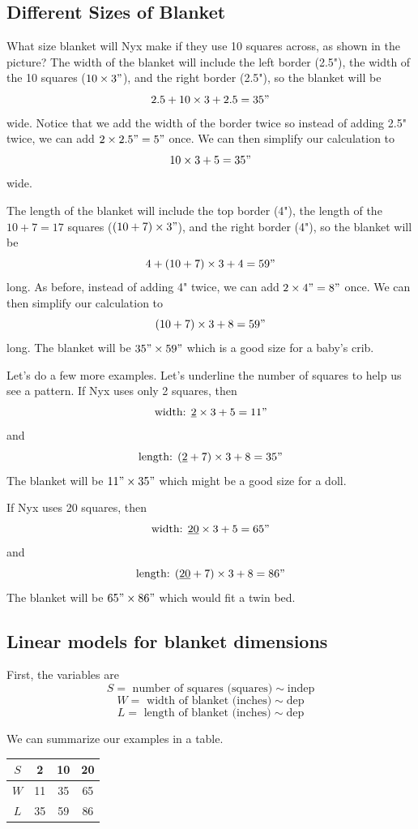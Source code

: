 \subsection*{Different Sizes of Blanket}

What size blanket will Nyx make if they use 10 squares across, as shown in the picture?
The width of the blanket will include the left border (2.5"), the width of the 10 squares ($10 \times 3"$), and the right border (2.5"), so the blanket will be $$2.5+10\times3+2.5 = 35"
$$
wide.  Notice that we add the width of the border twice so instead of adding 2.5" twice, we can add $2 \times 2.5" = 5"$ once.  We can then simplify our calculation to $$10\times3+5 = 35"
$$
wide. 

The length of the blanket will include the top border (4"), the length of the $10+7=17$ squares ($(10+7) \times 3"$), and the right border (4"), so the blanket will be $$4+(10+7)\times 3+4 = 59"$$
long. As before, instead of adding 4" twice, we can add $2 \times 4"=8"$ once.  We can then simplify our calculation to $$(10+7)\times 3+8 = 59"$$ long.
The blanket will be $35" \times 59"$ which is a good size for a baby's crib.

Let's do a few more examples.  Let's underline the number of squares to help us see a pattern. If Nyx uses only 2 squares, then 
$$\text{width: }\underline{2}\times3+5 = 11"$$
and 
$$\text{length: }(\underline{2}+7)\times3+8 = 35"$$
The blanket will be $11" \times 35"$ which might be a good size for a doll.

If Nyx uses 20 squares, then
$$\text{width: }\underline{20}\times3+5 = 65"$$
and 
$$\text{length: }(\underline{20}+7)\times3+8 = 86"$$
The blanket will be $65" \times 86"$ which would fit a twin bed.

\subsection*{Linear models for blanket dimensions}

First, the variables are 
    $$S = \text{ number of squares (squares)} \sim \text{indep}$$
    $$W = \text{ width of blanket (inches)} \sim \text{dep}$$
    $$L = \text{ length of blanket (inches)} \sim \text{dep}$$

We can summarize our examples in a table.

\begin{center}
    \begin{tabular}{c|c|c|c}
        $S$ & 2 & 10 & 20 \\ \hline
        $W$ & 11 & 35 & 65 \\ \hline
        $L$ & 35 & 59 & 86
    \end{tabular}
\end{center}

